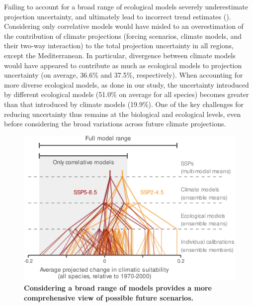 \documentclass[11pt,letter]{article}
\begin{document}

Failing to account for a broad range of ecological models severely underestimate projection uncertainty, and ultimately lead to incorrect trend estimates (). Considering only correlative models would have misled to an overestimation of the contribution of climate projections (forcing scenarios, climate models, and their two-way interaction) to the total projection uncertainty in all regions, except the Mediterranean. In particular, divergence between climate models would have appeared to contribute as much as ecological models to projection uncertainty (on average, 36.6\% and 37.5\%, respectively). When accounting for more diverse ecological models, as done in our study, the uncertainty introduced by different ecological models (51.0\% on average for all species) becomes greater than that introduced by climate models (19.9\%). One of the key challenges for reducing uncertainty thus remains at the biological and ecological levels, even before considering the broad variations across future climate projections.


\begin{figure}
	\centering
	\includegraphics[width=0.6\linewidth]{../newfigures/files/allspecies_cascade}
	\caption{\textbf{Considering a broad range of models provides a more comprehensive view of possible future scenarios.}}
	\label{fig:cascade}
\end{figure}
\end{document}
